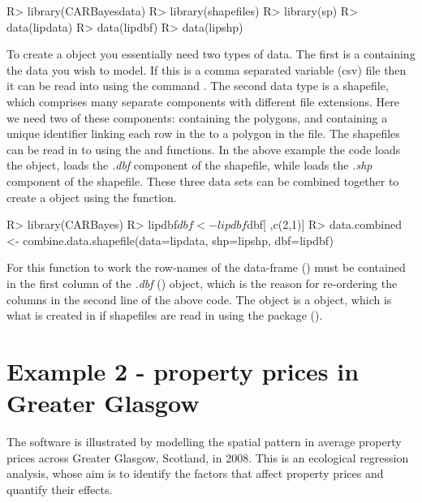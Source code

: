 \documentclass[article,shortnames,nojss]{jss}
\begin{document}
\begin{Schunk}
\begin{Sinput}
R> library(CARBayesdata)
R> library(shapefiles)
R> library(sp)
R> data(lipdata)
R> data(lipdbf)
R> data(lipshp)
\end{Sinput}
\end{Schunk}

To create a  object you essentially need two types of data. The first is a  containing the data you wish to model. If this is a  comma separated variable (csv) file then it can be read into  using the command . The second data type is a shapefile, which comprises many separate components with different file extensions. Here we need two of these components:  containing the polygons, and  containing a unique identifier linking each row in the  to a polygon in the  file. The shapefiles can be read in to  using the  and  functions. In the above example the code  loads the  object,  loads the \emph{.dbf} component of the shapefile, while  loads the \emph{.shp} component of the shapefile. These three data sets can be combined together to create a  object using the  function.

\begin{Schunk}
\begin{Sinput}
R> library(CARBayes)
R> lipdbf$dbf <- lipdbf$dbf[ ,c(2,1)]
R> data.combined <- combine.data.shapefile(data=lipdata, shp=lipshp, dbf=lipdbf)
\end{Sinput}
\end{Schunk}

For this function to work the row-names of the data-frame () must be contained in the first column of the \emph{.dbf} () object, which is the reason for re-ordering the columns in the second line of the above code. The  object is a  object, which is what is created in  if shapefiles are read in using the   package (\citealp{rgdal}). 


\section{Example 2 - property prices in Greater Glasgow}
The  software is illustrated by modelling the spatial pattern in average property prices across Greater Glasgow, Scotland, in 2008. This is an ecological regression analysis, whose aim is to  identify the factors that affect property prices and quantify their effects.
\end{document}
